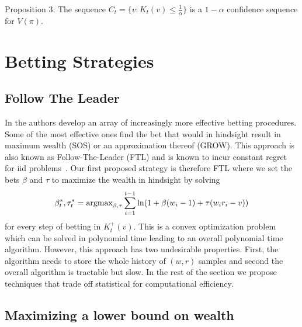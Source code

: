 Proposition 3: The sequence $C_t = \{v:K_t(v)\leq \frac{1}{\alpha}\}$ is a $1-\alpha$ confidence sequence for $V(\pi)$.

\section{Betting Strategies}

\subsection{Follow The Leader}
In \cite{waudby-smith_variance-adaptive_2020} the authors develop
an array of increasingly more effective betting procedures. 
Some of the most effective ones find the bet that would in hindsight
result in maximum wealth (SOS) or an approximation thereof (GROW).
This approach is also known as Follow-The-Leader (FTL) and is 
known to incur constant regret for iid 
problems~\cite{de2014follow}. Our first proposed strategy 
is therefore FTL where we set the 
bets $\beta$ and $\tau$ to maximize the wealth in hindsight
by solving
\begin{equation}
\beta_t^*,\tau_t^* = \operatorname{argmax}_{\beta,\tau} \sum_{i=1}^{t-1} \ln(1+\beta (w_i-1)+\tau(w_i r_i - v)) \label{eq:ftl}
\end{equation}
for every step of betting in $K_t^+(v)$. This is a convex optimization problem which can be solved in polynomial time
leading to an overall polynomial time algorithm. However,
this approach has two undesirable properties. First, the 
algorithm needs to store the whole history of $(w,r)$ samples
and second the overall algorithm is tractable but slow.
In the rest of the section we propose techniques that trade off
statistical for computational efficiency.

\subsection{Maximizing a lower bound on wealth}

